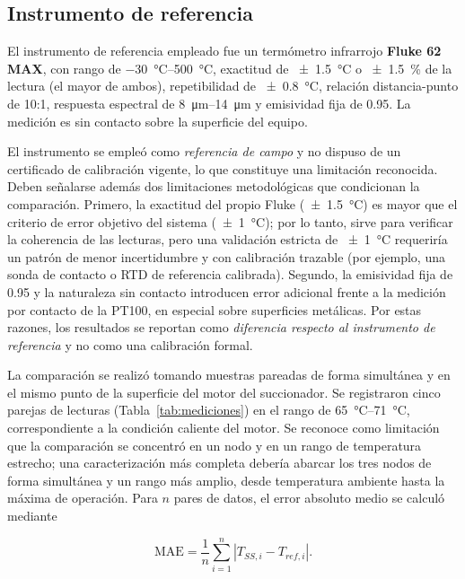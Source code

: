 \documentclass[conference]{IEEEtran}
\begin{document}
\subsection{Instrumento de referencia}

El instrumento de referencia empleado fue un termómetro infrarrojo \textbf{Fluke 62 MAX}, con rango de \SIrange{-30}{500}{\celsius}, exactitud de \SI{\pm 1.5}{\celsius} o \SI{\pm 1.5}{\percent} de la lectura (el mayor de ambos), repetibilidad de \SI{\pm 0.8}{\celsius}, relación distancia-punto de 10:1, respuesta espectral de \SIrange{8}{14}{\micro\meter} y emisividad fija de \num{0.95}. La medición es sin contacto sobre la superficie del equipo.

El instrumento se empleó como \emph{referencia de campo} y no dispuso de un certificado de calibración vigente, lo que constituye una limitación reconocida. Deben señalarse además dos limitaciones metodológicas que condicionan la comparación. Primero, la exactitud del propio Fluke (\SI{\pm 1.5}{\celsius}) es mayor que el criterio de error objetivo del sistema (\SI{\pm 1}{\celsius}); por lo tanto, sirve para verificar la coherencia de las lecturas, pero una validación estricta de \SI{\pm 1}{\celsius} requeriría un patrón de menor incertidumbre y con calibración trazable (por ejemplo, una sonda de contacto o RTD de referencia calibrada). Segundo, la emisividad fija de \num{0.95} y la naturaleza sin contacto introducen error adicional frente a la medición por contacto de la PT100, en especial sobre superficies metálicas. Por estas razones, los resultados se reportan como \emph{diferencia respecto al instrumento de referencia} y no como una calibración formal.

La comparación se realizó tomando muestras pareadas de forma simultánea y en el mismo punto de la superficie del motor del succionador. Se registraron cinco parejas de lecturas (Tabla~\ref{tab:mediciones}) en el rango de \SIrange{65}{71}{\celsius}, correspondiente a la condición caliente del motor. Se reconoce como limitación que la comparación se concentró en un nodo y en un rango de temperatura estrecho; una caracterización más completa debería abarcar los tres nodos de forma simultánea y un rango más amplio, desde temperatura ambiente hasta la máxima de operación. Para $n$ pares de datos, el error absoluto medio se calculó mediante

\begin{equation}
\mathrm{MAE}=\frac{1}{n}\sum_{i=1}^{n}\left|T_{SS,i}-T_{ref,i}\right|.
\label{eq:mae}
\end{equation}
\end{document}
